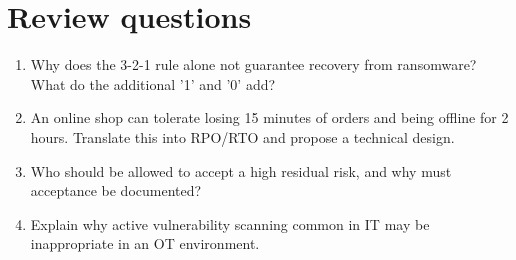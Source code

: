 \section*{Review questions}
\begin{enumerate}
  \item Why does the 3-2-1 rule alone not guarantee recovery from ransomware? What do the additional '1' and '0' add?
  \item An online shop can tolerate losing 15 minutes of orders and being offline for 2 hours. Translate this into RPO/RTO and propose a technical design.
  \item Who should be allowed to accept a high residual risk, and why must acceptance be documented?
  \item Explain why active vulnerability scanning common in IT may be inappropriate in an OT environment.
\end{enumerate}
